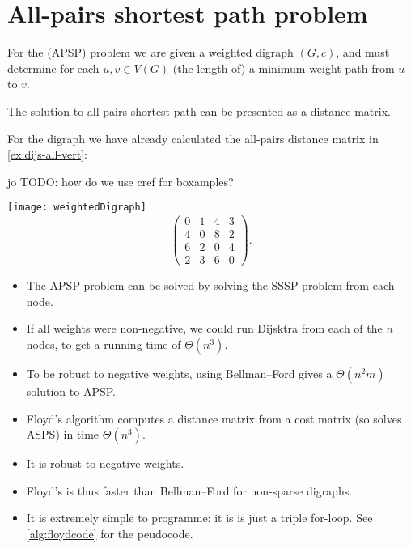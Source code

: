 


\chapter{All-pairs shortest path problem} %
\label{sec:APSP}

For the  (APSP) problem we are given a weighted digraph $(G, c)$, and must determine 
for each $u, v\in V(G)$ (the length of) a minimum weight path from $u$
to $v$.

The solution to all-pairs shortest path can be presented as a distance matrix.

\begin{Boxample}[0]
\label{eg:APSP}
For the digraph we have already
calculated the all-pairs distance matrix in \cref{ex:dijs-all-vert}:

jo TODO: how do we use cref for boxamples?

\texttt{[image: weightedDigraph]}
$$
\left(
\begin{matrix}
0 & 1 & 4 & 3 \\
4 & 0 & 8 & 2 \\
6 & 2 & 0 & 4 \\
2 & 3 & 6 & 0
\end{matrix}
\right).
$$
\end{Boxample}

\begin{itemize}
\item The APSP problem can be solved by solving the SSSP problem from each node.
\item If all weights were non-negative, we could run Dijsktra from each of the $n$ nodes, to get a running time of $\Theta(n^3)$.
\item To be robust to negative weights, using Bellman--Ford gives a $\Theta(n^2 m)$ solution to APSP.
\item Floyd's algorithm computes a distance matrix
from a cost matrix (so solves ASPS) in time $\Theta(n^3)$. 
\item It is robust to negative weights. 
\item Floyd's is thus faster than Bellman--Ford for non-sparse digraphs.
\item It is extremely simple to programme: it is is just a triple for-loop. See \cref{alg:floydcode} for the peudocode.
\end{itemize}

